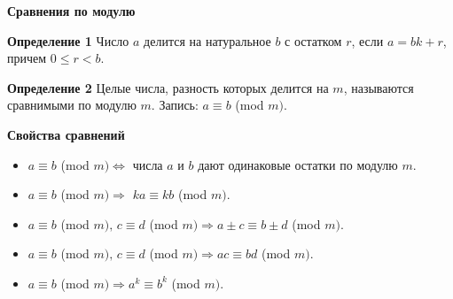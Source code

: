 \documentclass{article}
\begin{document}
\large
	
\begin{center}
	\textbf{Сравнения по модулю}
\end{center}


\textbf{Определение 1}
Число $a$ делится на натуральное $b$ с остатком $r$, если $a = bk + r$, причем $0 \le r < b$.

\textbf{Определение 2}
Целые числа, разность которых делится на $m$, называются сравнимыми по модулю $m$. Запись: $a \equiv b$  (mod $m)$.

\textbf{Свойства сравнений}

\begin{itemize}
	\item $a \equiv b$  (mod $m) \Leftrightarrow$ числа $a$ и $b$ дают одинаковые остатки по модулю $m$.
	
	\item $a \equiv b$  (mod $m) \Rightarrow$ $ka \equiv kb$ (mod $m)$.
	
	\item $a \equiv b$  (mod $m),\, c \equiv d$ (mod $m) \Rightarrow a\pm c \equiv b\pm d$ (mod $m)$.
	
	\item $a \equiv b$  (mod $m),\, c \equiv d$ (mod $m) \Rightarrow ac \equiv bd$ (mod $m)$.
	
	\item $a \equiv b$  (mod $m) \Rightarrow a^k \equiv b^k$ (mod $m)$.
\end{itemize}
\end{document}
